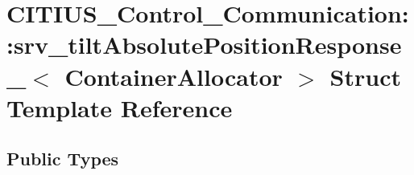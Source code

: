 \hypertarget{struct_c_i_t_i_u_s___control___communication_1_1srv__tilt_absolute_position_response__}{\section{\-C\-I\-T\-I\-U\-S\-\_\-\-Control\-\_\-\-Communication\-:\-:srv\-\_\-tilt\-Absolute\-Position\-Response\-\_\-$<$ \-Container\-Allocator $>$ \-Struct \-Template \-Reference}
\label{struct_c_i_t_i_u_s___control___communication_1_1srv__tilt_absolute_position_response__}
}
\subsection*{\-Public \-Types}

